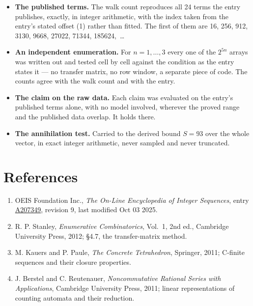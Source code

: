 \documentclass[11pt]{article}
\theoremstyle{definition}
\begin{document}
\begin{itemize}

\item {\bfseries The published terms.} The walk count reproduces all 24 terms the entry publishes, exactly, in integer arithmetic, with the index taken from the entry's stated offset (1) rather than fitted. The first of them are 16, 256, 912, 3130, 9668, 27022, 71344, 185624,~\dots

\item {\bfseries An independent enumeration.} For $n = 1,\dots,3$ every one of the $2^{5n}$ arrays was written out and tested cell by cell against the condition as the entry states it --- no transfer matrix, no row window, a separate piece of code. The counts agree with the walk count and with the entry.

\item {\bfseries The claim on the raw data.} Each claim was evaluated on the entry's published terms alone, with no model involved, wherever the proved range and the published data overlap. It holds there.

\item {\bfseries The annihilation test.} Carried to the derived bound $S = 93$ over the whole vector, in exact integer arithmetic, never sampled and never truncated.

\end{itemize}

\section{References}

\begin{enumerate}

\item OEIS Foundation Inc., \emph{The On-Line Encyclopedia of Integer Sequences}, entry \href{https://oeis.org/A207349}{A207349}, revision 9, last modified Oct 03 2025.

\item R. P. Stanley, \emph{Enumerative Combinatorics}, Vol.~1, 2nd ed., Cambridge University Press, 2012; \S4.7, the transfer-matrix method.

\item M. Kauers and P. Paule, \emph{The Concrete Tetrahedron}, Springer, 2011; C-finite sequences and their closure properties.

\item J. Berstel and C. Reutenauer, \emph{Noncommutative Rational Series with Applications}, Cambridge University Press, 2011; linear representations of counting automata and their reduction.

\end{enumerate}
\end{document}
